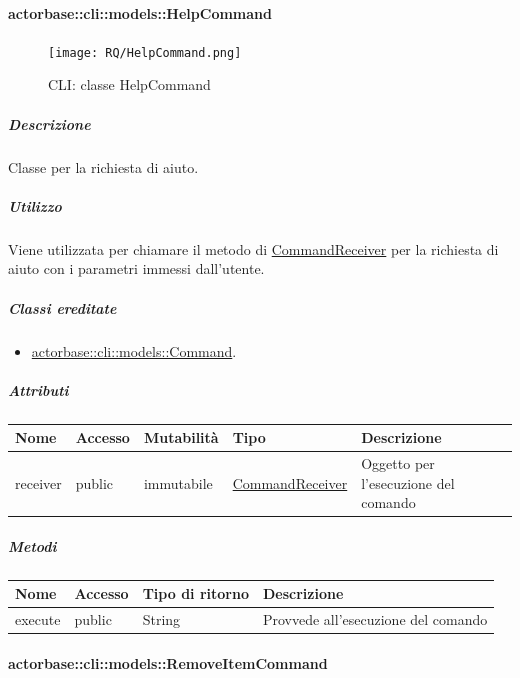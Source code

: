\documentclass{scalatekids-article}
\begin{document}
\paragraph{actorbase::cli::models::HelpCommand}
\label{sec:actorbase::cli::models::HelpCommand}

\begin{figure}[H]
  \begin{center}
    \texttt{[image: RQ/HelpCommand.png]}
    \caption{CLI: classe HelpCommand}
  \end{center}
\end{figure}

\subparagraph{Descrizione}
Classe per la richiesta di aiuto.

\subparagraph{Utilizzo}

Viene utilizzata per chiamare il metodo di
\hyperref[sec:actorbase::cli::models::CommandReceiver]{CommandReceiver} per la richiesta di aiuto con i
parametri immessi dall'utente.

\subparagraph{Classi ereditate}

\begin{itemize}
\item \hyperref[sec:actorbase::cli::models::Command]{actorbase::cli::models::Command}.
\end{itemize}

\subparagraph{Attributi}

\begin{tabular}{| p{1cm} | p{1.5cm} | p{2cm} | p{4cm} | p{8.5cm} |}
  \hline
  Nome & Accesso & Mutabilità & Tipo & Descrizione\\
  \hline
  receiver & public & immutabile & \hyperref[sec:actorbase::cli::models::CommandReceiver]{CommandReceiver} & Oggetto per l'esecuzione del comando\\
  \hline
\end{tabular}

\subparagraph{Metodi}

\begin{tabular}{| l | l | l | l |}
  \hline
  Nome & Accesso & Tipo di ritorno & Descrizione\\
  \hline
  execute & public & String & Provvede all'esecuzione del comando\\
  \hline
\end{tabular}

\paragraph{actorbase::cli::models::RemoveItemCommand}
\label{sec:actorbase::cli::models::RemoveItemCommand}
\end{document}
